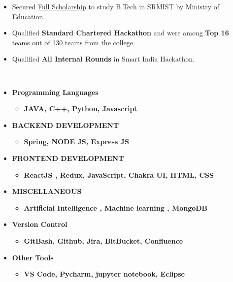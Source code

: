 \documentclass[10pt,a4paper,ragged2e]{altacv}
\begin{document}

\smallskip
\begin{itemize} 

\item Secured {\href{https://drive.google.com/file/d/1K9TxfIsDdyIawl8IvawiYR7e_VbFSKrf/view?usp=sharing}{Full Scholarship}} to study B.Tech in SRMIST by Ministry of Education.
\smallskip
\item Qualified \textbf{Standard Chartered Hackathon} and were among \textbf{Top 16} teams out of 130 teams from the college.
\smallskip
\item Qualified \textbf{All Internal Rounds} in Smart India Hackathon.\\
\end{itemize}
\\
\begin{itemize}
\item \large{\textbf{Programming Languages}}
  \begin{itemize}
  \smallskip
    \item \textbf{JAVA, C++, Python, Javascript}
  \end{itemize}
  \smallskip
  \item \large{\textbf{BACKEND DEVELOPMENT}} 
  \begin{itemize}
  \smallskip
  
   \item \textbf{Spring, NODE JS, Express JS}
  \end{itemize}
  \smallskip
    \item \large{\textbf{FRONTEND DEVELOPMENT}} 
  \begin{itemize}
  \smallskip
  
   \item \textbf{ReactJS , Redux, JavaScript, Chakra UI, HTML, CSS}
  \end{itemize}
  \smallskip
  \item \large{\textbf{MISCELLANEOUS}} 
  \begin{itemize}
  \smallskip
  
   \item \textbf{Artificial Intelligence  , Machine learning , MongoDB}
  \end{itemize}
  \smallskip
  
  \item \large{\textbf{Version Control}}
  \begin{itemize}
  \smallskip
    \item \textbf{GitBash, Github, Jira, BitBucket, Confluence}
  \end{itemize}
   \smallskip
  \smallskip
  \item \large{\textbf{Other Tools}}
  \begin{itemize}
  \smallskip
    \item \textbf{VS Code, Pycharm, jupyter notebook, Eclipse}  
  \end{itemize}
\end{itemize}
\end{document}
